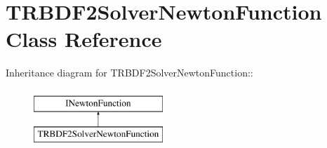 \hypertarget{classTRBDF2SolverNewtonFunction}{
\section{TRBDF2SolverNewtonFunction Class Reference}
\label{classTRBDF2SolverNewtonFunction}
}
Inheritance diagram for TRBDF2SolverNewtonFunction::\begin{figure}[H]
\begin{center}
\leavevmode
\includegraphics[height=2cm]{classTRBDF2SolverNewtonFunction}
\end{center}
\end{figure}
